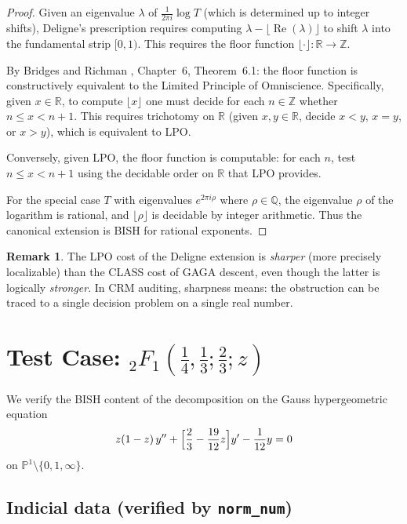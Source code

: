 \documentclass[11pt,a4paper]{article}
\theoremstyle{plain}
\theoremstyle{definition}
\newtheorem{remark}[theorem]{Remark}
\newcommand{\BISH}{\textsf{BISH}}
\newcommand{\LPO}{\textsf{LPO}}
\newcommand{\CLASS}{\textsf{CLASS}}
\newcommand{\Z}{\mathbb{Z}}
\newcommand{\Q}{\mathbb{Q}}
\newcommand{\R}{\mathbb{R}}
\newcommand{\PP}{\mathbb{P}}
\renewcommand{\Re}{\operatorname{Re}}
\begin{document}
\begin{proof}
Given an eigenvalue $\lambda$ of $\frac{1}{2\pi i} \log T$ (which is determined up to integer shifts), Deligne's prescription requires computing $\lambda - \lfloor \Re(\lambda) \rfloor$ to shift $\lambda$ into the fundamental strip $[0,1)$.
This requires the floor function $\lfloor \cdot \rfloor : \R \to \Z$.

By Bridges and Richman \cite{BridgesRichman1987}, Chapter~6, Theorem~6.1:
the floor function is constructively equivalent to the Limited Principle of Omniscience.
Specifically, given $x \in \R$, to compute $\lfloor x \rfloor$ one must decide for each $n \in \Z$ whether $n \le x < n+1$.
This requires trichotomy on $\R$ (given $x, y \in \R$, decide $x < y$, $x = y$, or $x > y$), which is equivalent to \LPO.

Conversely, given \LPO, the floor function is computable: for each $n$, test $n \le x < n+1$ using the decidable order on $\R$ that \LPO{} provides.

For the special case $T$ with eigenvalues $e^{2\pi i \rho}$ where $\rho \in \Q$, the eigenvalue $\rho$ of the logarithm is rational, and $\lfloor \rho \rfloor$ is decidable by integer arithmetic.
Thus the canonical extension is \BISH{} for rational exponents.
\end{proof}

\begin{remark}
The \LPO{} cost of the Deligne extension is \emph{sharper} (more precisely localizable) than the \CLASS{} cost of GAGA descent, even though the latter is logically \emph{stronger}.
In CRM auditing, sharpness means: the obstruction can be traced to a single decision problem on a single real number.
\end{remark}

\section{Test Case: ${}_2F_1(\tfrac{1}{4}, \tfrac{1}{3}; \tfrac{2}{3}; z)$}

We verify the BISH content of the decomposition on the Gauss hypergeometric equation
\[
z(1-z)\,y'' + \Bigl[\frac{2}{3} - \frac{19}{12}z\Bigr]y' - \frac{1}{12}y = 0
\]
on $\PP^1 \setminus \{0, 1, \infty\}$.

\subsection{Indicial data (verified by \texttt{norm\_num})}
\end{document}
